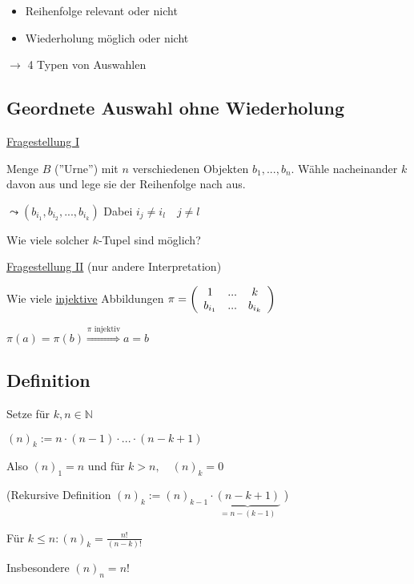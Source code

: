 \documentclass[a4paper, 12pt, twoside] {article}
\begin{document}

\begin{itemize}
\item Reihenfolge relevant oder nicht
\item Wiederholung möglich oder nicht
\end{itemize}
$\to$ 4 Typen von Auswahlen

\subsection{Geordnete Auswahl ohne Wiederholung} %

\underline{Fragestellung I}

Menge $B$ (''Urne'') mit $n$ verschiedenen Objekten $b_1,...,b_n$. Wähle nacheinander $k$ davon aus und lege sie der Reihenfolge nach aus.

$\leadsto (b_{i_1}, b_{i_2},...,b_{i_k})$ Dabei $i_j \neq i_l \quad j \neq l$


Wie viele solcher $k$-Tupel sind möglich?

\underline{Fragestellung II} (nur andere Interpretation)

Wie viele \uline{injektive} Abbildungen  $\pi = \left( \begin{array}{c c c}
1 & ... & k \\
b_{i_1} & ... & b_{i_k}
\end{array} \right)$

$\pi(a) = \pi(b) \overset{\pi \text{ injektiv}}{\Rightarrow} a = b$

\subsection{Definition} %

Setze für $k,n \in \mathbb{N}$

$(n)_k := n \cdot (n-1) \cdot ... \cdot (n-k+1)$

Also $(n)_1 = n$ und für $k > n, \quad (n)_k = 0$

(Rekursive Definition $(n)_k := (n)_{k-1} \cdot \underbrace{(n-k+1)}_{=n-(k-1)}$ )

Für $k \leq n : (n)_k = \frac{n!}{(n-k)!}$

Insbesondere $(n)_n = n!$
\end{document}
